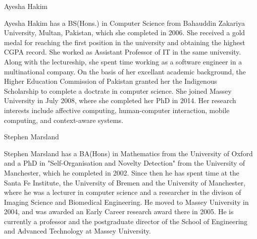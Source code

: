 \documentclass[10pt,journal,cspaper,compsoc]{IEEEtran}
\begin{document}
\begin{biography}{Ayesha Hakim}

Ayesha Hakim has a BS(Hons.) in Computer Science from Bahauddin Zakariya University, Multan, Pakistan, which she completed in 2006. She received a gold medal for reaching the first position in the university and obtaining the highest CGPA record. She worked as Assistant Professor of IT in the same university. Along with the lectureship, she spent time working as a software engineer in a multinational company. On the basis of her excellant academic background, the Higher Education Commission of Pakistan granted her the Indigenous Scholarship to complete a doctrate in computer science. She joined Massey University in July 2008, where she completed her PhD in 2014. Her research interests include affective computing, human-computer interaction, mobile computing, and context-aware systems.
\end{biography}

\begin{biography}{Stephen Marsland}

Stephen Marsland has a BA(Hons) in Mathematics from the University of Oxford and a PhD in "Self-Organisation and Novelty Detection" from the University of Manchester, which he completed in 2002. Since then he has spent time at the Santa Fe Institute, the University of Bremen and the University of Manchester, where he was a lecturer in computer science and a researcher in the divison of Imaging Science and Biomedical Engineering. He moved to Massey University in 2004, and was awarded an Early Career research award there in 2005. He is currently a professor and the postgraduate director of the School of Engineering and Advanced Technology at Massey University.
\end{biography}
\end{document}
